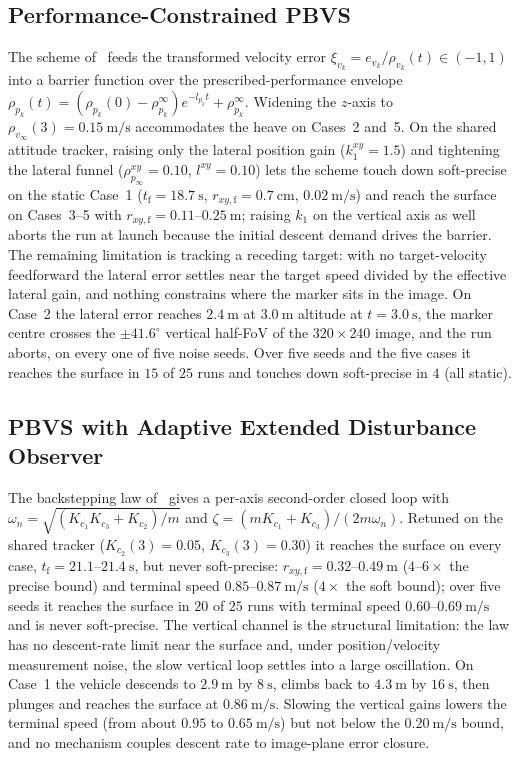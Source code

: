 \documentclass{IEEEtaes}
\theoremstyle{definition}
\theoremstyle{remark}
\begin{document}
\subsection{Performance-Constrained PBVS \cite{lin2022}}
The scheme of~\cite{lin2022} feeds the transformed velocity error $\xi_{v_k}=e_{v_k}/\rho_{v_k}(t)\in(-1,1)$ into a barrier function over the prescribed-performance envelope $\rho_{p_k}(t)=(\rho_{p_k}(0)-\rho_{p_k}^\infty)e^{-l_{p_k}t}+\rho_{p_k}^\infty$. Widening the $z$-axis to $\rho_{v_\infty}(3)=0.15~\text{m/s}$ accommodates the heave on Cases~2 and~5. On the shared attitude tracker, raising only the lateral position gain ($k_1^{xy}=1.5$) and tightening the lateral funnel ($\rho_{p_\infty}^{xy}=0.10$, $l^{xy}=0.10$) lets the scheme touch down soft-precise on the static Case~1 ($t_\text{f}=18.7~\text{s}$, $r_{xy,\text{f}}=0.7~\text{cm}$, $0.02~\text{m/s}$) and reach the surface on Cases~3--5 with $r_{xy,\text{f}}=0.11$--$0.25~\text{m}$; raising $k_1$ on the vertical axis as well aborts the run at launch because the initial descent demand drives the barrier. The remaining limitation is tracking a receding target: with no target-velocity feedforward the lateral error settles near the target speed divided by the effective lateral gain, and nothing constrains where the marker sits in the image. On Case~2 the lateral error reaches $2.4~\text{m}$ at $3.0~\text{m}$ altitude at $t=3.0~\text{s}$, the marker centre crosses the $\pm41.6^\circ$ vertical half-FoV of the $320\times240$ image, and the run aborts, on every one of five noise seeds. Over five seeds and the five cases it reaches the surface in $15$ of $25$ runs and touches down soft-precise in $4$ (all static).

\subsection{PBVS with Adaptive Extended Disturbance Observer \cite{zhang2026}}
The backstepping law of~\cite{zhang2026} gives a per-axis second-order closed loop with $\omega_n=\sqrt{(K_{c_1}K_{c_3}+K_{c_2})/m}$ and $\zeta=(mK_{c_1}+K_{c_3})/(2m\omega_n)$. Retuned on the shared tracker ($K_{c_2}(3)=0.05$, $K_{c_3}(3)=0.30$) it reaches the surface on every case, $t_\text{f}=21.1$--$21.4~\text{s}$, but never soft-precise: $r_{xy,\text{f}}=0.32$--$0.49~\text{m}$ ($4$--$6\times$ the precise bound) and terminal speed $0.85$--$0.87~\text{m/s}$ ($4\times$ the soft bound); over five seeds it reaches the surface in $20$ of $25$ runs with terminal speed $0.60$--$0.69~\text{m/s}$ and is never soft-precise. The vertical channel is the structural limitation: the law has no descent-rate limit near the surface and, under position/velocity measurement noise, the slow vertical loop settles into a large oscillation. On Case~1 the vehicle descends to $2.9~\text{m}$ by $8~\text{s}$, climbs back to $4.3~\text{m}$ by $16~\text{s}$, then plunges and reaches the surface at $0.86~\text{m/s}$. Slowing the vertical gains lowers the terminal speed (from about $0.95$ to $0.65~\text{m/s}$) but not below the $0.20~\text{m/s}$ bound, and no mechanism couples descent rate to image-plane error closure.
\end{document}
